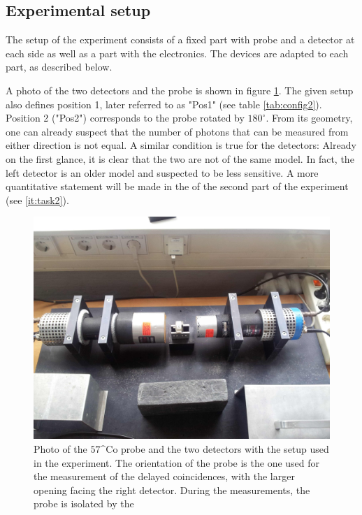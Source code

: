\subsection{Experimental setup}
The setup of the experiment consists of a fixed part with probe and a detector at each side 
as well as a part with the electronics. The devices are adapted to each part, as described below. 

A photo of the two detectors and the probe is shown in figure \ref{fig:position_1}. The given setup also 
defines position 1, later referred to as "Pos1" (see table \ref{tab:config2}). Position 2 ("Pos2") corresponds 
to the probe rotated by $180^\circ$. From its geometry, one can already suspect that the number of photons 
that can be measured from either direction is not equal. A similar condition is true for the detectors:
Already on the first glance, it is clear that the two are not of the same model. In fact, the left detector 
is an older model and suspected to be less sensitive. A more quantitative statement will be made in the 
of the second part of the experiment (see \ref{it:task2}).

\begin{figure}[H]
    \centering
    \includegraphics[width=0.8\linewidth]{figures/position_1.jpg}
    \caption{
        Photo of the $57$^Co probe and the two detectors with the setup used in the 
        experiment. The orientation of the probe is the one used for the measurement of 
        the delayed coincidences, with the larger opening facing the right detector. 
        During the measurements, the probe is isolated by the 
        }
    \label{fig:position_1}
\end{figure}



